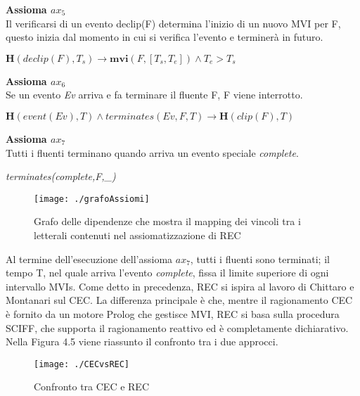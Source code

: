 \documentclass[a4paper,12pt]{report}
\begin{document}
\textbf{Assioma $ax_5$}\\
Il verificarsi di un evento declip(F) determina l'inizio di un nuovo MVI per F, questo inizia dal momento in cui si verifica l'evento e terminerà in futuro.
\begin{center}
$\textbf{H}(declip(F),T_s)\rightarrow \textbf{mvi}(F,[T_s,T_e])\wedge T_e>T_s$
\end{center}
\textbf{Assioma $ax_6$}\\
Se un evento \textit{Ev} arriva e fa terminare il fluente F, F viene interrotto.
\begin{center}
$\textbf{H}(event(Ev),T)\wedge terminates(Ev,F,T)\rightarrow \textbf{H}(clip(F),T)$
\end{center}
\textbf{Assioma $ax_7$}\\
Tutti i fluenti terminano quando arriva un evento speciale \textit{complete}.
\begin{center}
\textit{terminates(complete,F,\_)}
\end{center}
\newpage
\begin{figure}[h]
    \begin{center}
        \texttt{[image: ./grafoAssiomi]}
        \caption{Grafo delle dipendenze che mostra il mapping dei vincoli tra i letterali contenuti nel assiomatizzazione di REC}
        \label{grafo}
    \end{center}
\end{figure}
Al termine dell'esecuzione dell'assioma $ax_7$, tutti i fluenti sono terminati; il tempo T, nel quale arriva l'evento \textit{complete}, fissa il limite superiore di ogni intervallo MVIs.
Come detto in precedenza, REC si ispira al lavoro di Chittaro e Montanari sul CEC. La differenza principale è che, mentre il ragionamento CEC è fornito da un motore Prolog che gestisce MVI, REC si basa sulla procedura SCIFF, che supporta il ragionamento reattivo ed è completamente dichiarativo.\\Nella Figura 4.5 viene riassunto il confronto tra i due approcci.
\begin{figure}[h]
\begin{center}
    \texttt{[image: ./CECvsREC]}
    \caption{Confronto tra CEC e REC}
    \label{CEC-REC}
\end{center}
\end{figure}
\newpage
\end{document}

